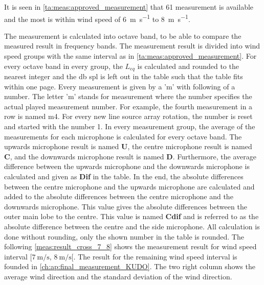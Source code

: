 It is seen in \autoref{ta:meas:approved_measurement} that 61 measurement is available and the most is within wind speed of \SI{6}{\meter\per\second} to \SI{8}{\meter\per\second}.

The measurement is calculated into octave band, to be able to compare the measured result in frequency bands. The measurement result is divided into wind speed groups with the same interval as in \autoref{ta:meas:approved_measurement}. For every octave band in every group, the $L_{eq}$ is calculated and rounded to the nearest integer and the \si{\decibel} \gls{spl} is left out in the table such that the table fits within one page. Every measurement is given by a 'm' with following of a number. The letter 'm' stands for measurement where the number specifies the actual played measurement number. For example, the fourth measurement in a row is named m4. For every new line source array rotation, the number is reset and started with the number 1. In every measurement group, the average of the measurements for each microphone is calculated for every octave band. The upwards microphone result is named \textbf{U}, the centre microphone result is named \textbf{C}, and the downwards microphone result is named \textbf{D}. Furthermore, the average difference between the upwards microphone and the downwards microphone is calculated and given as \textbf{Dif} in the table. In the end, the absolute differences between the centre microphone and the upwards microphone are calculated and added to the absolute differences between the centre microphone and the downwards microphone. This value gives the absolute differences between the outer main lobe to the centre. This value is named \textbf{Cdif} and is referred to as the absolute difference between the centre and the side microphone. All calculation is done without rounding, only the shown number in the table is rounded. The following \autoref{meas:result_cross_7_8} shows the measurement result for wind speed interval $[\SI{7}{\meter\per\second},\, \SI{8}{\meter\per\second}[ $. The result for the remaining wind speed interval is founded in \autoref{ch:ap:final_measurement_KUDO}. The two right column shows the average wind direction and the standard deviation of the wind direction.






